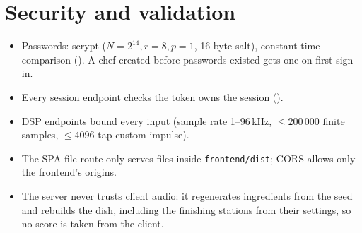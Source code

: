 \documentclass[11pt,a4paper]{article}
\begin{document}
\section{Security and validation}
\begin{itemize}
\item Passwords: scrypt ($N=2^{14},r=8,p=1$, 16-byte salt), constant-time comparison
  (). A chef created before passwords existed gets one on first
  sign-in.
\item Every session endpoint checks the token owns the session ().
\item DSP endpoints bound every input (sample rate 1--96\,kHz, $\le200\,000$ finite samples,
  $\le4096$-tap custom impulse).
\item The SPA file route only serves files inside \texttt{frontend/dist}; CORS allows only the
  frontend's origins.
\item The server never trusts client audio: it regenerates ingredients from the seed and
  rebuilds the dish, including the finishing stations from their settings, so no score is
  taken from the client.
\end{itemize}

\end{document}
